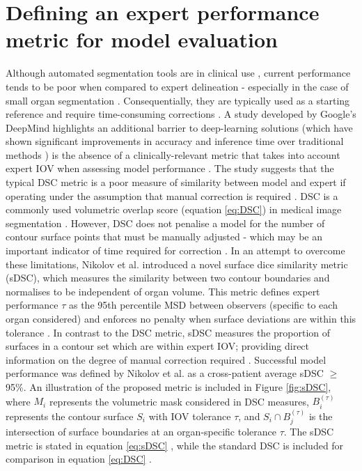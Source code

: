\section{Defining an expert performance metric for model evaluation}
Although automated segmentation tools are in clinical use \cite{Zhu_2018}, current performance tends to be poor when compared to expert delineation - especially in the case of small organ segmentation \cite{Nikolov_2018, Zhu_2018}. Consequentially, they are typically used as a starting reference and require time-consuming corrections \cite{Nikolov_2018, Nemoto_2020}. A study developed by Google's DeepMind highlights an additional barrier to deep-learning solutions (which have shown significant improvements in accuracy and inference time over traditional methods \cite{Zhu_2018}) is the absence of a clinically-relevant metric that takes into account expert IOV when assessing model performance \cite{Nikolov_2018}. The study suggests that the typical DSC metric is a poor measure of similarity between model and expert if operating under the assumption that manual correction is required \cite{Nikolov_2018}. DSC is a commonly used volumetric overlap score (equation \ref{eq:DSC}) in medical image segmentation \cite{Taha_2015}. However, DSC does not penalise a model for the number of contour surface points that must be manually adjusted \cite{Nikolov_2018} - which may be an important indicator of time required for correction \cite{Nikolov_2018}. In an attempt to overcome these limitations, Nikolov et al. introduced a novel surface dice similarity metric (sDSC), which measures the similarity between two contour boundaries and normalises to be independent of organ volume. This metric defines expert performance $\tau$ as the 95th percentile MSD between observers (specific to each organ considered) and enforces no penalty when surface deviations are within this tolerance \cite{Nikolov_2018}. In contrast to the DSC metric,  sDSC measures the proportion of surfaces in a contour set which are within expert IOV; providing direct information on the degree of manual correction required \cite{Nikolov_2018}. Successful model performance was defined by Nikolov et al. as a cross-patient average sDSC $\geq$ 95\%. An illustration of the proposed metric is included in Figure \ref{fig:sDSC},
where $M_{i}$ represents the volumetric mask considered in DSC measures, $B_{i}^{(\tau)}$ represents the contour surface $S_{i}$ with IOV tolerance $\tau$, and $S_{i} \cap B_{j}^{(\tau)}$ is the intersection of surface boundaries at an organ-specific tolerance $\tau$. The sDSC metric is stated in equation \ref{eq:sDSC} \cite{Nemoto_2020}, while the standard DSC is included for comparison in equation \ref{eq:DSC} \cite{Bertels2019}.

